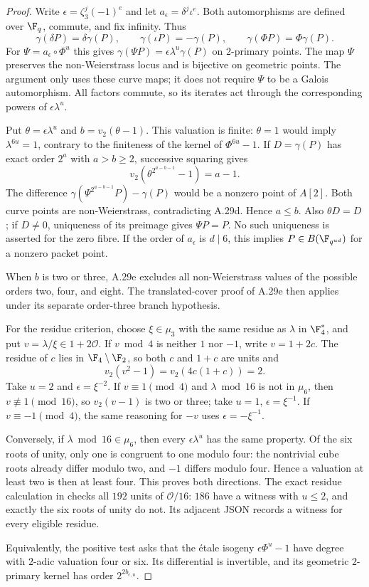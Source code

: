 \begin{proof}
Write $\epsilon=\zeta_3^j(-1)^e$ and let
$a_\epsilon=\delta^j\iota^e$. Both automorphisms are
defined over $\F_q$, commute, and fix infinity. Thus
\[
 \gamma(\delta P)=\delta\gamma(P),\qquad
 \gamma(\iota P)=-\gamma(P),\qquad
 \gamma(\Phi P)=\Phi\gamma(P).
\]
For $\Psi=a_\epsilon\circ\Phi^u$ this gives
$\gamma(\Psi P)=\epsilon\lambda^u\gamma(P)$ on
$2$-primary points. The map $\Psi$ preserves the
non-Weierstrass locus and is bijective on geometric
points. The argument only uses these curve maps;
it does not require $\Psi$ to be a Galois automorphism.
All factors commute, so its iterates act through
the corresponding powers of $\epsilon\lambda^u$.

Put $\theta=\epsilon\lambda^u$ and $b=v_2(\theta-1)$.
This valuation is finite: $\theta=1$ would imply
$\lambda^{6u}=1$, contrary to the finiteness of the
kernel of $\Phi^{6u}-1$. If $D=\gamma(P)$ has exact
order $2^a$ with $a>b\ge2$, successive squaring gives
\[
 v_2(\theta^{2^{a-b-1}}-1)=a-1.
\]
The difference
$\gamma(\Psi^{2^{a-b-1}}P)-\gamma(P)$ would be a
nonzero point of $A[2]$. Both curve points are
non-Weierstrass, contradicting A.29d. Hence $a\le b$.
Also $\theta D=D$; if $D\ne0$, uniqueness of its
preimage gives $\Psi P=P$. No such uniqueness is
asserted for the zero fibre. If the order of
$a_\epsilon$ is $d\mid6$, this implies
$P\in B(\F_{q^{ud}})$ for a nonzero packet point.

When $b$ is two or three, A.29e excludes all
non-Weierstrass values of the possible orders
two, four, and eight. The translated-cover proof
of A.29e then applies under its separate order-three
branch hypothesis.

For the residue criterion, choose $\xi\in\mu_3$
with the same residue as $\lambda$ in $\F_4^*$,
and put $v=\lambda/\xi\in1+2\mathcal O$.
If $v\bmod4$ is neither $1$ nor $-1$, write
$v=1+2c$. The residue of $c$ lies in
$\F_4\setminus\F_2$, so both $c$ and $1+c$ are
units and
\[
 v_2(v^2-1)=v_2(4c(1+c))=2.
\]
Take $u=2$ and $\epsilon=\xi^{-2}$.
If $v\equiv1\pmod4$ and $\lambda\bmod16$ is
not in $\mu_6$, then $v\not\equiv1\pmod{16}$,
so $v_2(v-1)$ is two or three; take
$u=1$, $\epsilon=\xi^{-1}$. If
$v\equiv-1\pmod4$, the same reasoning for $-v$
uses $\epsilon=-\xi^{-1}$.

Conversely, if $\lambda\bmod16\in\mu_6$, then
every $\epsilon\lambda^u$ has the same property.
Of the six roots of unity, only one is congruent
to one modulo four: the nontrivial cube roots
already differ modulo two, and $-1$ differs
modulo four. Hence a valuation at least two is
then at least four. This proves both directions.
The exact residue calculation in
checks all $192$ units of $\mathcal O/16$:
$186$ have a witness with $u\le2$, and exactly
the six roots of unity do not. Its adjacent JSON
records a witness for every eligible residue.

Equivalently, the positive test asks that the
\'{e}tale isogeny $\epsilon\Phi^u-1$ have degree
with $2$-adic valuation four or six. Its differential
is invertible, and its geometric $2$-primary kernel
has order $2^{2b_{\epsilon,u}}$.
\end{proof}

